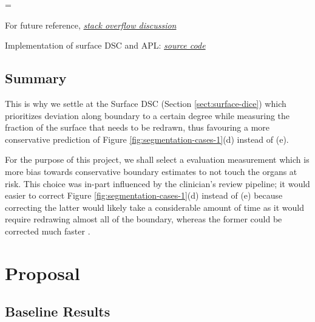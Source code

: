 \documentclass[11pt,twoside]{report}
\newenvironment{warning}
  {\par\begin{mdframed}[linewidth=1pt,linecolor=black]%
    \begin{list}{}{\leftmargin=1cm
                   \labelwidth=\leftmargin}\item[\Large\ding{43}]}
  {\end{list}\end{mdframed}\par}
\begin{document}
\begin{warning}
  For future reference, \textit{\href{https://stackoverflow.com/questions/73286639/how-to-calculate-added-path-length-apl-image-segmentation-metric}{stack overflow discussion}}

  Implementation of surface DSC and APL: \textit{\href{https://github.com/pyplati/platipy/blob/master/platipy/imaging/label/comparison.py}{source code}}
\end{warning}

\section{Summary}

This is why we settle at the Surface DSC (Section \ref{sect:surface-dice}) which prioritizes deviation along boundary to a certain degree while measuring the fraction of the surface that needs to be redrawn, thus favouring a more conservative prediction of Figure \ref{fig:segmentation-cases-1}(d) instead of (e).

For the purpose of this project, we shall select a evaluation measurement which is more bias towards conservative boundary estimates to not touch the organs at risk. This choice was in-part influenced by the clinician's review pipeline; it would easier to correct Figure \ref{fig:segmentation-cases-1}(d) instead of (e) because correcting the latter would likely take a considerable amount of time as it would require redrawing almost all of the boundary, whereas the former could be corrected much faster \cite{Nikolov2021-xe}.


\chapter{Proposal}\label{sect:proposal}

\section{Baseline Results}\label{sect:baseline-results}
\end{document}
